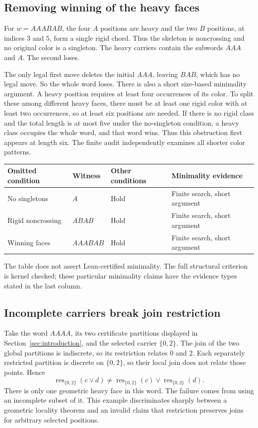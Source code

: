 \documentclass[11pt,reqno]{amsart}
\theoremstyle{definition}
\newcommand{\Res}{\operatorname{res}}
\begin{document}
\subsection{Removing winning of the heavy faces}
For $w=AAABAB$, the four $A$ positions are heavy and the two $B$ positions,
at indices $3$ and $5$, form a single rigid chord. Thus the skeleton is
noncrossing and no original color is a singleton. The heavy carriers contain
the subwords $AAA$ and $A$. The second loses.

The only legal first move deletes the initial $AAA$, leaving $BAB$, which
has no legal move. So the whole word loses. There is also a short
size-based minimality argument. A heavy position requires at least four
occurrences of its color. To split these among different heavy faces,
there must be at least one rigid color with at least two occurrences, so
at least six positions are needed. If there is no rigid class and the total
length is at most five under the no-singleton condition, a heavy class
occupies the whole word, and that word wins. Thus this obstruction first
appears at length six. The finite audit independently examines all shorter
color patterns.

\begin{center}
\begin{tabular}{llll}
\toprule
Omitted condition & Witness & Other conditions & Minimality evidence\\
\midrule
No singletons & $A$ & Hold & Finite search, short argument\\
Rigid noncrossing & $ABAB$ & Hold & Finite search, short argument\\
Winning faces & $AAABAB$ & Hold & Finite search, short argument\\
\bottomrule
\end{tabular}
\end{center}
The table does not assert Lean-certified minimality. The full structural
criterion is kernel checked; these particular minimality claims have the
evidence types stated in the last column.

\subsection{Incomplete carriers break join restriction}
Take the word $AAAA$, its two certificate partitions displayed in
Section~\ref{sec:introduction}, and the selected carrier $\{0,2\}$.
The join of the two global partitions is indiscrete, so its restriction
relates $0$ and $2$. Each separately restricted partition is discrete on
$\{0,2\}$, so their local join does not relate those points. Hence
\[
 \Res_{\{0,2\}}(c\vee d)\ne
 \Res_{\{0,2\}}(c)\vee\Res_{\{0,2\}}(d).
\]
There is only one geometric heavy face in this word. The failure comes from
using an incomplete subset of it. This example discriminates sharply
between a geometric locality theorem and an invalid claim that restriction
preserves joins for arbitrary selected positions.
\end{document}
